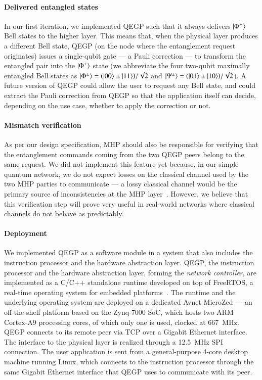 \paragraph{Delivered entangled states}

In our first iteration, we implemented QEGP such that it always delivers $\ket{\Phi^+}$ Bell states
to the higher layer. This means that, when the physical layer produces a different Bell state, QEGP
(on the node where the entanglement request originates) issues a single-qubit gate --- a Pauli
correction --- to transform the entangled pair into the $\ket{\Phi^+}$ state (we abbreviate the four
two-qubit maximally entangled Bell states as $\ket{\Phi^\pm} = (\ket{00} \pm \ket{11})/\sqrt{2}$ and
$\ket{\Psi^\pm} = (\ket{01} \pm \ket{10})/\sqrt{2}$). A future version of QEGP could allow the user
to request any Bell state, and could extract the Pauli correction from QEGP so that the application
itself can decide, depending on the use case, whether to apply the correction or not.

\paragraph{Mismatch verification}

As per our design specification, MHP should also be responsible for verifying that the entanglement
commands coming from the two QEGP peers belong to the same request. We did not implement this
feature yet because, in our simple quantum network, we do not expect losses on the classical channel
used by the two MHP parties to communicate --- a lossy classical channel would be the primary source
of inconsistencies at the MHP layer~\cite{dahlberg_2019_egp}. However, we believe that this
verification step will prove very useful in real-world networks where classical channels do not
behave as predictably.

\paragraph{Deployment}

We implemented QEGP as a software module in a system that also includes the instruction processor
and the hardware abstraction layer. QEGP, the instruction processor and the hardware abstraction
layer, forming the \emph{network controller}, are implemented as a C/C++ standalone runtime
developed on top of FreeRTOS, a real-time operating system for embedded platforms~\cite{freertos}.
The runtime and the underlying operating system are deployed on a dedicated Avnet MicroZed --- an
off-the-shelf platform based on the Zynq-7000 SoC, which hosts two ARM Cortex-A9 processing cores,
of which only one is used, clocked at \qty{667}{\MHz}. QEGP connects to its remote peer via TCP over
a Gigabit Ethernet interface. The interface to the physical layer is realized through a
\qty{12.5}{\MHz} SPI connection. The user application is sent from a general-purpose 4-core desktop
machine running Linux, which connects to the instruction processor through the same Gigabit Ethernet
interface that QEGP uses to communicate with its peer.

